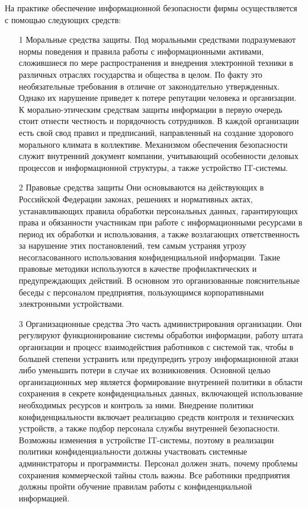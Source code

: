На практике обеспечение информационной безопасности фирмы осуществляется с помощью следующих средств:
\begin{enumerate}
    \item[1] Моральные средства защиты.
Под моральными средствами подразумевают нормы поведения и правила работы с информационными активами, сложившиеся по мере распространения и внедрения электронной техники в различных отраслях государства и общества в целом. По факту это необязательные требования в отличие от законодательно утвержденных. Однако их нарушение приведет к потере репутации человека и организации.  
К морально-этическим средствам защиты информации в первую очередь стоит отнести честность и порядочность сотрудников. В каждой организации есть свой свод правил и предписаний, направленный на создание здорового морального климата в коллективе.  Механизмом обеспечения безопасности служит внутренний документ компании, учитывающий особенности деловых процессов и информационной структуры, а также устройство IT-системы.
     \item[2] Правовые средства защиты 
Они основываются на действующих в Российской Федерации законах, решениях и нормативных актах, устанавливающих правила обработки персональных данных, гарантирующих права и обязанности участникам при работе с информационными ресурсами в период их обработки и использования, а также возлагающих ответственность за нарушение этих постановлений, тем самым устраняя угрозу несогласованного использования конфиденциальной информации. Такие правовые методики используются в качестве профилактических и предупреждающих действий. В основном это организованные пояснительные беседы с персоналом предприятия, пользующимся корпоративными электронными устройствами. 
     \item[3] Организационные средства 
Это часть администрирования организации. Они регулируют функционирование системы обработки информации, работу штата организации и процесс взаимодействия работников с системой так, чтобы в большей степени устранить или предупредить угрозу информационной атаки либо уменьшить потери в случае их возникновения. Основной целью организационных мер является формирование внутренней политики в области сохранения в секрете конфиденциальных данных, включающей использование необходимых ресурсов и контроль за ними.
Внедрение политики конфиденциальности включает реализацию средств контроля и технических устройств, а также подбор персонала службы внутренней безопасности.  Возможны изменения в устройстве IT-системы, поэтому в реализации политики конфиденциальности должны участвовать системные администраторы и программисты. Персонал должен знать, почему проблемы сохранения коммерческой тайны столь важны. Все работники предприятия должны пройти обучение правилам работы с конфиденциальной информацией.

\end{enumerate}
